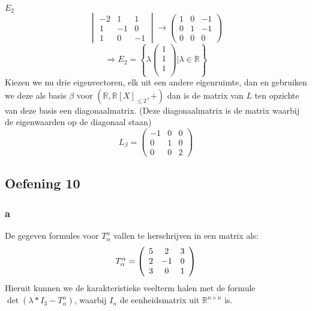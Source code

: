 \documentclass[lineaire_algebra_oplossingen.tex]{subfiles}
\begin{document}
\emph{$E_2$}\\
\[
\begin{vmatrix}
-2 & 1 & 1\\
1 & -1& 0\\
1 & 0 & -1
\end{vmatrix}
\rightarrow
\begin{pmatrix}
1 & 0 & -1\\
0 & 1 & -1\\
0 & 0 & 0
\end{pmatrix}
\]
\[
\Rightarrow E_2 = 
\left\{ 
\lambda
\begin{pmatrix}
1\\1\\1\\
\end{pmatrix}
| \lambda \in \mathbb{R}
\right\}
\]
Kiezen we nu drie eigenvectoren, elk uit een andere eigenruimte, dan en gebruiken we deze als basis $\beta$ voor $(\mathbb{R},\mathbb{R}[X]_{\le 2},+)$ dan is de matrix van $L$ ten opzichte van deze basis een diagonaalmatrix.
(Deze diagonaalmatrix is de matrix waarbij de eigenwaarden op de diagonaal staan)
\[
L_\beta = 
\begin{pmatrix}
-1 & 0 & 0\\
 0 & 1 & 0\\
 0 & 0 & 2
\end{pmatrix}
\]


\subsection{Oefening 10}

\subsubsection*{a}
De gegeven formules voor $T^\alpha_\alpha$ vallen te herschrijven in een matrix als:
\[
T^\alpha_\alpha = \left(
\begin{array}{c c c}
5 & 2 & 3 \\
2 & -1 & 0 \\
3 & 0 & 1 \\
\end{array}
\right)
\]
Hieruit kunnen we de karakteristieke veelterm halen met de formule $\det(\lambda * I_3 - T^\alpha_\alpha)$, waarbij $I_n$ de eenheidsmatrix uit $\mathbb{R}^{n\times n}$ is.
\end{document}
